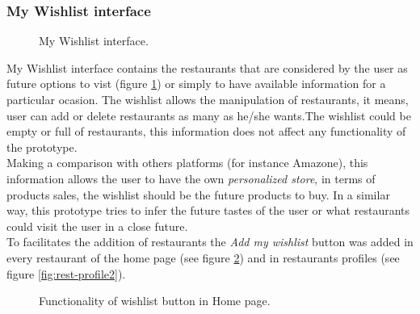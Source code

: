 \subsubsection{My Wishlist interface}
\begin{figure}
\captionsetup{font=footnotesize}
\centering
{}
\caption{My Wishlist interface.}
\label{fig:mywishlist}   
\end{figure}
My Wishlist interface contains the restaurants that are 
considered by the user as future options to vist (figure \ref{fig:mywishlist}) 
or simply to have available information for a particular 
ocasion. The wishlist allows the manipulation of restaurants, 
it means, user can add or delete restaurants as many as 
he/she wants.The wishlist could be empty or full of 
restaurants, this information does not affect any functionality 
of the prototype. \\
Making a comparison with others platforms (for instance 
Amazone), this information allows the user to have the own 
\textit{personalized store}, in terms of products sales, the wishlist 
should be the future products to buy. In a similar way, 
this prototype tries to infer the future tastes of the user 
or what restaurants could visit the user in a close future. \\
To facilitates the addition of restaurants the \textit{Add my wishlist} 
button was added in every restaurant of the home 
page (see figure \ref{fig:wishlist-home}) and in restaurants 
profiles (see figure \ref{fig:rest-profile2}).
\begin{figure}
\captionsetup{font=footnotesize}
\centering
{}
\caption{Functionality of wishlist button in Home page.}
\label{fig:wishlist-home}   
\end{figure}
